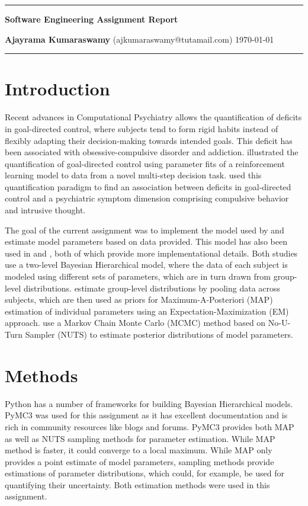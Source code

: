 \documentclass[10pt,a4paper]{article}
\begin{document}
\begin{center}
\hrule
\vspace{.4cm}
\huge {\bf{}\selectfont Software Engineering Assignment Report}
\vspace{.2cm}
\end{center}
\large {\bf Ajayrama Kumaraswamy}  (ajkumaraswamy@tutamail.com) \hfill \today\\
\hrule

\section*{Introduction}
Recent advances in Computational Psychiatry allows the quantification of deficits in goal-directed control, where subjects tend to form rigid habits instead of flexibly adapting their decision-making towards intended goals. This deficit has been associated with obsessive-compulsive disorder and addiction. \cite{Daw2011} illustrated the quantification of goal-directed control using parameter fits of a reinforcement learning model to data from a novel multi-step decision task. \cite{Gillan2016} used this quantification paradigm to find an association between deficits in goal-directed control and a psychiatric symptom dimension comprising compulsive behavior and intrusive thought.

The goal of the current assignment was to implement the model used by \cite{Gillan2016} and estimate model parameters based on data provided. This model has also been used in \cite{Otto2013} and \cite{Huys2011}, both of which provide more implementational details. Both studies use a two-level Bayesian Hierarchical model, where the data of each subject is modeled using different sets of parameters, which are in turn drawn from group-level distributions. \cite{Huys2011} estimate group-level distributions by pooling data across subjects, which are then used as priors for Maximum-A-Posteriori (MAP) estimation of individual parameters using an Expectation-Maximization (EM) approach. \cite{Otto2013} use a Markov Chain Monte Carlo (MCMC) method based on No-U-Turn Sampler (NUTS) to estimate posterior distributions of model parameters. 

\section*{Methods}
Python has a number of frameworks for building Bayesian Hierarchical models. PyMC3 \citep{Salvatier2016} was used for this assignment as it has excellent documentation and is rich in community resources like blogs and forums. PyMC3 provides both MAP as well as NUTS sampling methods for parameter estimation. While MAP method is faster, it could converge to a local maximum.  While MAP only provides a point estimate of model parameters, sampling methods provide estimations of parameter distributions, which could, for example, be used for quantifying their uncertainty. Both estimation methods were used in this assignment.
\end{document}
